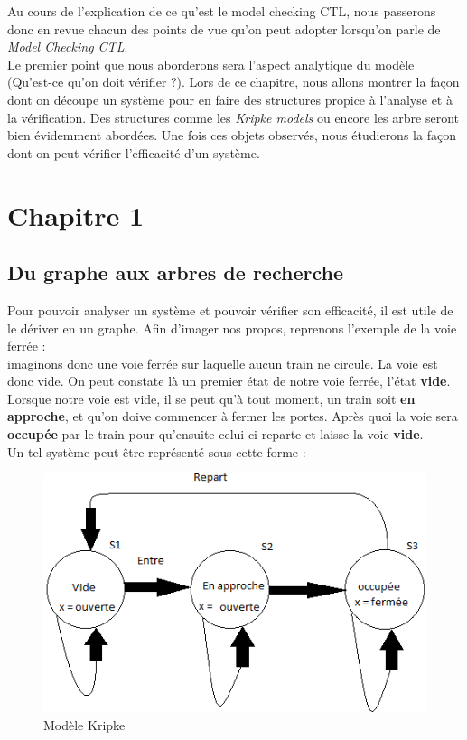 \documentclass[runningheads,a4paper]{llncs}
\begin{document}
\noindent Au cours de l'explication de ce qu'est le model checking CTL, nous passerons donc en revue chacun des points de vue qu'on peut adopter lorsqu'on parle de \textit{Model Checking CTL}.\\
Le premier point que nous aborderons sera l'aspect analytique du modèle (Qu'est-ce qu'on doit vérifier ?). Lors de ce chapitre, nous allons montrer la façon dont on découpe un système pour en faire des structures propice à l'analyse et à la vérification. Des structures comme les \textit{Kripke models} ou encore les arbre seront bien évidemment abordées. Une fois ces objets observés, nous étudierons la façon dont on peut vérifier l'efficacité d'un système.


\section{Chapitre 1}
\subsection{Du graphe aux arbres de recherche}

Pour pouvoir analyser un système et pouvoir vérifier son efficacité, il est utile de le dériver en un graphe. Afin d'imager nos propos, reprenons l'exemple de la voie ferrée :\\ imaginons donc une voie ferrée sur laquelle aucun train ne circule. La voie est donc vide. On peut constate là un premier état de notre voie ferrée, l'état \textbf{vide}. Lorsque notre voie est vide, il se peut qu'à tout moment, un train soit \textbf{en approche}, et qu'on doive commencer à fermer les portes. Après quoi la voie sera \textbf{occupée} par le train pour qu'ensuite celui-ci reparte et laisse la voie \textbf{vide}.\\

\noindent Un tel système peut être représenté sous cette forme :  

\begin{figure}[!h]
	\includegraphics[scale=0.5]{graphe.png}
	\centering
	\caption{Modèle Kripke}
	\label{label-image3}
\end{figure}
\end{document}
